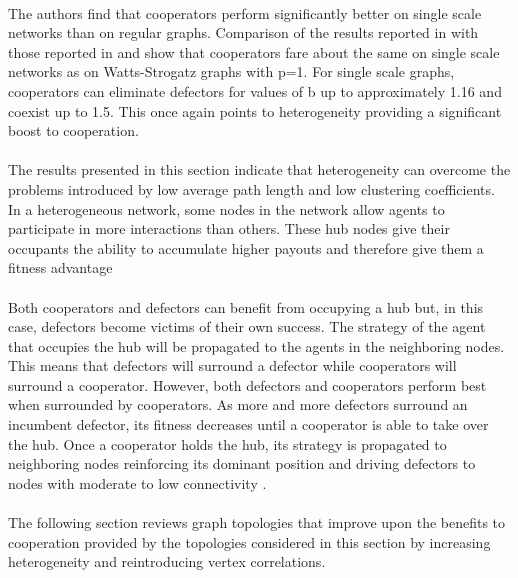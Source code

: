 \documentclass{article}
\begin{document}
	\paragraph{}The authors find that cooperators perform significantly better on single scale networks than on regular graphs.  Comparison of the results reported in \cite{Santos2006c} with those reported in \cite{Pacheco2005} and \cite{Santos2005a} show that cooperators fare about the same on single scale networks as on Watts-Strogatz graphs with p=1.  For single scale graphs, cooperators can eliminate defectors for values of b up to approximately 1.16 and coexist up to 1.5.  This once again points to heterogeneity providing a significant boost to cooperation.
	\paragraph{}The results presented in this section indicate that heterogeneity can overcome the problems introduced by low average path length and low clustering coefficients.  In a heterogeneous network, some nodes in the network allow agents to participate in more interactions than others.  These hub nodes give their occupants the ability to accumulate higher payouts and therefore give them a fitness advantage
	\paragraph{}Both cooperators and defectors can benefit from occupying a hub but, in this case, defectors become victims of their own success.  The strategy of the agent that occupies the hub will be propagated to the agents in the neighboring nodes.  This means that defectors will surround a defector while cooperators will surround a cooperator.  However, both defectors and cooperators perform best when surrounded by cooperators.  As more and more defectors surround an incumbent defector, its fitness decreases until a cooperator is able to take over the hub.  Once a cooperator holds the hub, its strategy is propagated to neighboring nodes reinforcing its dominant position and driving defectors to nodes with moderate to low connectivity \cite{Pacheco2005}\cite{Santos2006a}\cite{Santos2006b}.
	\paragraph{}The following section reviews graph topologies that improve upon the benefits to cooperation provided by the topologies considered in this section by increasing heterogeneity and reintroducing vertex correlations.
\end{document}
